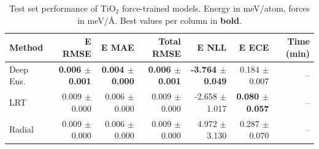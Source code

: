 \begin{table}
\centering
\caption{Test set performance of TiO$_2$ force-trained models. Energy in meV/atom, forces in meV/\AA{}. Best values per column in \textbf{bold}.}
\label{tab:tio2_results}
\begin{tabular}{lrrrrrr}
\toprule
Method & E RMSE & E MAE & Total RMSE & E NLL & E ECE & Time (min) \\
\midrule
Deep Ens. & \textbf{0.006 $\pm$ 0.001} & \textbf{0.004 $\pm$ 0.000} & \textbf{0.006 $\pm$ 0.001} & \textbf{-3.764 $\pm$ 0.049} & 0.184 $\pm$ 0.007 & -- \\
LRT & 0.009 $\pm$ 0.000 & 0.006 $\pm$ 0.000 & 0.009 $\pm$ 0.000 & -2.658 $\pm$ 1.017 & \textbf{0.080 $\pm$ 0.057} & -- \\
Radial & 0.009 $\pm$ 0.000 & 0.006 $\pm$ 0.000 & 0.009 $\pm$ 0.000 & 4.972 $\pm$ 3.130 & 0.287 $\pm$ 0.070 & -- \\
\bottomrule
\end{tabular}
\end{table}